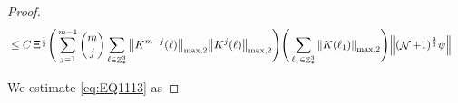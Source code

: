 \documentclass[sn-mathphys, Numbered ,a4paper]{sn-jnl}%
\DeclareMathOperator{\Z}{\mathbb{Z}}
\DeclareMathOperator{\NN}{\mathcal{N}}
\newcommand{\half}{\frac{1}{2}}
\theoremstyle{plain}
\theoremstyle{definition}
\theoremstyle{remark}
\theoremstyle{plain}
\theoremstyle{definition}
\theoremstyle{remark}
\begin{document}
\begin{proof}
\begin{alignat}{2}
	&\leq C\,\Xi^\half \Bigg(\sum\limits_{j=1}^{m-1} {{m}\choose j} \sum\limits_{\ell \in \Z^3_*} \norm{K^{m-j}(\ell)}_{ \mathrm{max,2} } \norm{K^{j}(\ell)}_{\mathrm{max,2}}\Bigg) \Bigg(\sum\limits_{ \ell_1\in \Z^3_*}\norm{  K(\ell_1)}_{\mathrm{max,2}}\Bigg)  \norm{(\NN+1)^\frac{3}{2} \psi} \label{eq:estEQ1112}
\end{alignat} 

We estimate \eqref{eq:EQ1113} as
\begin{comment}
	\begin{align}*(2 max,2 squared)
		&\eqref{eq:EQ1113}\nonumber\\
		&\leq\sum\limits_{\ell, \ell_1\in \Z^3_*} \mathds{1}_{L_{\ell_1}}(q) \mathds{1}_{L_{\ell}}(q) \norm{\sum\limits_{s \in L_{\ell},s_1\in L_{\ell_1}} K^m(\ell)_{q,s}K(\ell_1)_{q,s_1} b_{-s_1}(-\ell_1) b_{s}(\ell) a_{q-\ell_1}\psi}\norm{ a_{q-\ell}\psi }\nonumber\\
		&\leq\sum\limits_{\ell, \ell_1\in \Z^3_*} \mathds{1}_{L_{\ell_1}}(q) \mathds{1}_{L_{\ell}}(q) \Bigg(\sum\limits_{s \in L_{\ell}}\abs{K^m(\ell)_{q,s}}^2\Bigg)^\half \Bigg(\sum\limits_{s \in L_{\ell}}\norm{\sum\limits_{s_1\in L_{\ell_1}} K(\ell_1)_{q,s_1} b_{-s_1}(-\ell_1) b_{s}(\ell) a_{q-\ell_1}\psi}^2\Bigg)^\half \norm{ a_{q-\ell}\psi }\nonumber\\
		&\leq\sum\limits_{\ell, \ell_1\in \Z^3_*} \mathds{1}_{L_{\ell_1}}(q) \mathds{1}_{L_{\ell}}(q) \Bigg(\sum\limits_{s \in L_{\ell}} \abs{K^m(\ell)_{q,s}}^2 \Bigg)^\half \Bigg(\sum\limits_{s_1 \in L_{\ell_1}} \abs{K(\ell_1)_{q,s_1}}^2 \Bigg)^\half \Bigg(\sum\limits_{s \in L_{\ell},s_1\in L_{\ell_1}} \norm{ b_{-s_1}(-\ell_1) b_{s}(\ell) a_{q-\ell_1}\psi}^2\Bigg)^\half \norm{ a_{q-\ell}\psi }\nonumber\\
		&\leq\sum\limits_{\ell, \ell_1\in \Z^3_*} \mathds{1}_{L_{\ell_1}}(q) \mathds{1}_{L_{\ell}}(q) \!\!\! \sum\limits_{s \in L_{\ell},s_1\in L_{\ell_1}}\!\!  \norm{ K^m(\ell)_{q,s}K(\ell_1)_{q,s_1} b_{-s_1}(-\ell_1) b_{s}(\ell) a_{q-\ell_1} (\NN+5)^{-\alpha}\psi}\norm{ a_{q-\ell} (\NN+5)^{\alpha} \psi }\nonumber\\
		&\leq\sum\limits_{\ell, \ell_1\in \Z^3_*} \mathds{1}_{L_{\ell}}(q) \mathds{1}_{L_{\ell_1}}(q) \norm{K^m(\ell)}_{\mathrm{max}} \norm{ K(\ell_1)}_{\mathrm{max}} \!  \norm{ a_{q-\ell_1} (\NN+1) (\NN+1)^{-\alpha} \psi} \norm{ a_{q-\ell} (\NN+5)^{\alpha} \psi }\nonumber
	\end{align}
	\begin{align} {1 max,2 squared}
		&\eqref{eq:EQ1113}\nonumber\\
		&\leq\sum\limits_{\ell, \ell_1\in \Z^3_*} \mathds{1}_{L_{\ell_1}}(q) \mathds{1}_{L_{\ell}}(q) \sum\limits_{s_1 \in L_{\ell_1}} \norm{\sum\limits_{s\in L_{\ell}} K^m(\ell)_{q,s}K(\ell_1)_{q,s_1} b_{-s_1}(-\ell_1) b_{s}(\ell) a_{q-\ell_1}\psi}\norm{ a_{q-\ell}\psi }\nonumber\\

\end{comment}
\end{proof}
\end{document}
